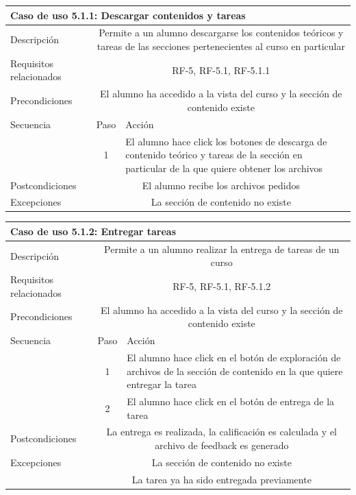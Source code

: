 \hspace{3cm} 

\begin{tabular}[H]{l c l}
\toprule 
\multicolumn{3}{l}{\textbf{Caso de uso 5.1.1: Descargar contenidos y tareas}}\\
\midrule
Descripción & \multicolumn{2}{p{10cm}}{Permite a un alumno descargarse los contenidos teóricos y tareas de las secciones pertenecientes al curso en particular}\\
\midrule
Requisitos relacionados & \multicolumn{2}{p{10cm}}{RF-5, RF-5.1, RF-5.1.1}\\
\midrule
Precondiciones & \multicolumn{2}{p{10cm}}{El alumno ha accedido a la vista del curso y la sección de contenido existe}\\
\midrule
Secuencia & Paso & Acción \\
\cmidrule{2-3}
         & 1 &  \multicolumn{1}{p{8cm}}{El alumno hace click los botones de descarga de contenido teórico y tareas de la sección en particular de la que quiere obtener los archivos}\\

\midrule
Postcondiciones & \multicolumn{2}{p{10cm}}{El alumno recibe los archivos pedidos}\\
\midrule
Excepciones & \multicolumn{2}{p{10cm}}{La sección de contenido no existe}\\
\bottomrule 
\end{tabular}

\hspace{3cm} 

\begin{tabular}[H]{l c l}
\toprule 
\multicolumn{3}{l}{\textbf{Caso de uso 5.1.2: Entregar tareas}}\\
\midrule
Descripción & \multicolumn{2}{p{10cm}}{Permite a un alumno realizar la entrega de tareas de un curso}\\
\midrule
Requisitos relacionados & \multicolumn{2}{p{10cm}}{RF-5, RF-5.1, RF-5.1.2}\\
\midrule
Precondiciones & \multicolumn{2}{p{10cm}}{El alumno ha accedido a la vista del curso y la sección de contenido existe}\\
\midrule
Secuencia & Paso & Acción \\
\cmidrule{2-3}
         & 1 &  \multicolumn{1}{p{8cm}}{El alumno hace click en el botón de exploración de archivos de la sección de contenido en la que quiere entregar la tarea}\\
         & 2 &  \multicolumn{1}{p{8cm}}{El alumno hace click en el botón de entrega de la tarea}\\
         
\midrule
Postcondiciones & \multicolumn{2}{p{10cm}}{La entrega es realizada, la calificación es calculada y el archivo de feedback es generado}\\
\midrule
Excepciones & \multicolumn{2}{p{10cm}}{La sección de contenido no existe}\\
            & \multicolumn{2}{p{10cm}}{La tarea ya ha sido entregada previamente}\\
\bottomrule 
\end{tabular}


